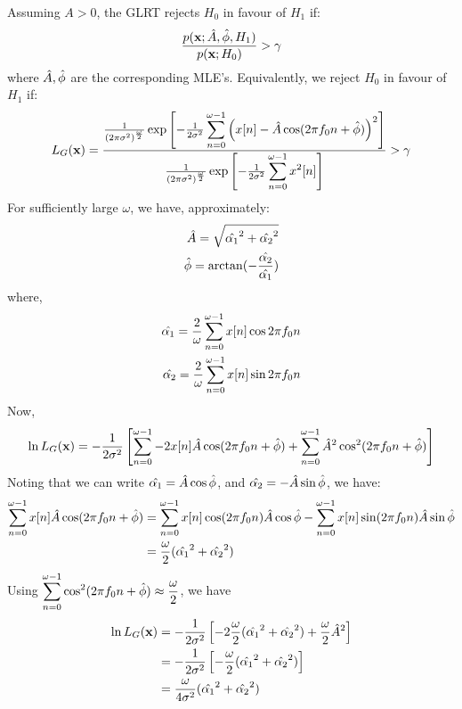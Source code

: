 \documentclass[10pt]{article}
\begin{document}
Assuming $A>0$, the GLRT rejects $H_0$ in favour of $H_1$ if:
\begin{align*}
    \frac{p(\textbf{x};\Hat{A}, \Hat{\phi}, H_1) }{p(\textbf{x};H_0)} > \gamma
\end{align*}
where $\Hat{A}, \Hat{\phi}$ are the corresponding MLE's. Equivalently, we reject $H_0$ in favour of $H_1$ if:
\begin{align}
   L_G(\textbf{x})= \dfrac{\frac{1}{(2\pi\sigma^2)^\frac{\omega}{2}}\exp \left[-\frac{1}{2\sigma^2}\displaystyle\sum_{n=0}^{\omega-1}\left(x[n]-\Hat{A}\cos(2\pi f_0n+\Hat{\phi})\right)^2\right]}{\frac{1}{(2\pi\sigma^2)^\frac{\omega}{2}}\exp \left[-\frac{1}{2\sigma^2}\displaystyle\sum_{n=0}^{\omega-1}x^2[n]\right]} > \gamma
\end{align}
For sufficiently large $\omega$, we have, approximately:
\begin{align}
    \Hat{A}=\sqrt{\Hat{{\alpha_1}}^2+\Hat{{\alpha_2}}^2}\\
    \Hat{\phi}=\arctan(-\frac{\Hat{\alpha_2}}{\Hat{\alpha_1}})
\end{align}
where,
\begin{align}
    \Hat{\alpha_1}=\frac{2}{\omega}\displaystyle\sum_{n=0}^{\omega-1}x[n]\cos{2\pi f_0n}\\
    \Hat{\alpha_2}=\frac{2}{\omega}\displaystyle\sum_{n=0}^{\omega-1}x[n]\sin{2\pi f_0n}
\end{align}
Now,
\begin{align*}
    \ln L_G(\textbf{x})=-\frac{1}{2\sigma^2}\left[\displaystyle\sum_{n=0}^{\omega-1}-2x[n]\Hat{A}\cos(2\pi f_0n+\Hat{\phi})+\displaystyle\sum_{n=0}^{\omega-1}\Hat{A}^2\cos^2(2\pi f_0n+\Hat{\phi}) \right]
\end{align*}
Noting that we can write $\Hat{\alpha_1}=\Hat{A}\cos\Hat{\phi}$, and $\Hat{\alpha_2}=-\Hat{A}\sin\Hat{\phi}$, we have:
\begin{align*}
  \displaystyle\sum_{n=0}^{\omega-1}x[n]\Hat{A}\cos(2\pi f_0n+\Hat{\phi})&= \displaystyle\sum_{n=0}^{\omega-1}x[n]\cos(2\pi f_0n)\Hat{A}\cos{\Hat{\phi}}-\displaystyle\sum_{n=0}^{\omega-1}x[n]\sin(2\pi f_0n)\Hat{A}\sin{\Hat{\phi}}\\
  &=\frac{\omega}{2}(\Hat{{\alpha_1}}^2+\Hat{{\alpha_2}}^2)\\
\end{align*}
Using $\displaystyle\sum_{n=0}^{\omega-1}\cos^2(2\pi f_0n+\Hat{\phi})\approx\frac{\omega}{2}$, we have
\begin{align*}
    \ln L_G(\textbf{x})&=-\frac{1}{2\sigma^2}\left[-2\frac{\omega}{2}(\Hat{{\alpha_1}}^2+\Hat{{\alpha_2}}^2)+\frac{\omega}{2}\Hat{A}^2   \right]\\
    &= -\frac{1}{2\sigma^2}\left[ -\frac{\omega}{2}(\Hat{{\alpha_1}}^2+\Hat{{\alpha_2}}^2)   \right]\\
    &=\frac{\omega}{4\sigma^2}(\Hat{{\alpha_1}}^2+\Hat{{\alpha_2}}^2)
\end{align*}
\end{document}
